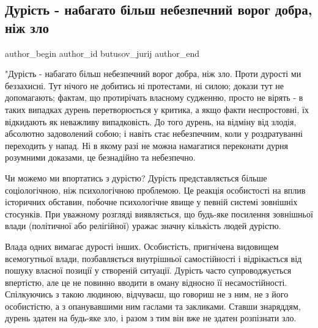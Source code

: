  
 
 
 
 
 
\subsection{Дурість - набагато більш небезпечний ворог добра, ніж зло}
\label{sec:03_12_2022.fb.butusov_jurij.1.durist}
 
\ifcmt
 author_begin
   author_id butusov_jurij
 author_end
\fi

"Дурість - набагато більш небезпечний ворог добра, ніж зло. Проти дурості ми
беззахисні. Тут нічого не добитись ні протестами, ні силою; докази тут не
допомагають; фактам, що протирічать власному судженню, просто не вірять - в
таких випадках дурень перетворюється у критика, а якщо факти неспростовні, їх
відкидають як неважливу випадковість. До того дурень, на відміну від злодія,
абсолютно задоволений собою; і навіть стає небезпечним, коли у роздратуванні
переходить у напад. Ні в якому разі не можна намагатися переконати дурня
розумними доказами, це безнадійно та небезпечно. 

Чи можемо ми впортатись з дурістю? Дурість представляється більше
соціологічною, ніж психологічною проблемою. Це реакція особистості на вплив
історичних обставин, побочне психологічне явище у певній системі зовнішніх
стосунків. При уважному розгляді виявляється, що будь-яке посилення зовнішньої
влади (політичної або релігійної) уражає значну кількість людей дурістю. 

Влада одних вимагає дурості інших. Особистість, пригнічена видовищем
всемогутньої влади, позбавляється внутрішньої самостійності і відрікається від
пошуку власної позиції у створеній ситуації. Дурість часто супроводжується
впертістю, але це не повинно вводити в оману відносно  її несамостійності.
Спілкуючись з такою людиною, відчуваєш, що говориш не з ним, не з його
особистістю, а з опанувавшими ним гаслами та закликами. Ставши знаряддям,
дурень здатен на будь-яке зло, і разом з тим він вже не здатен розпізнати зло.  


